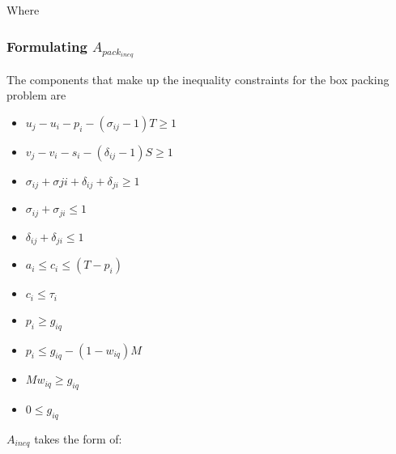 \documentclass[letterpaper, 10pt, conference]{IEEEtran}
\begin{document}
Where

\subsubsection{Formulating $A_{pack_{ineq}}$}
The components that make up the inequality constraints for the box
packing problem are

\begin{itemize}
\item
  \(u_j - u_i - p_i - (\sigma_{ij} - 1)T \geq 1\)
\item
  \(v_j - v_i - s_i - (\delta_{ij} - 1)S \geq 1\)
\item
  \(\sigma_{ij} + \sigma{ji} + \delta_{ij} + \delta_{ji} \geq 1\)
\item
  \(\sigma_{ij} + \sigma_{ji} \leq 1\)
\item
  \(\delta_{ij} + \delta_{ji} \leq 1\)
\item
  \(a_i \leq c_i \leq (T - p_i)\)
\item
  \(c_i \leq \tau_i\)
\item
  \(p_i \geq g_{iq}\)
\item
  \(p_i \leq g_{iq} - (1 - w_{iq})M\)
\item
  \(Mw_{iq} \geq g_{iq}\)
\item
  \(0 \leq g_{iq}\)
\end{itemize}

\(A_{ineq}\) takes the form of:

\scriptsize
\end{document}
